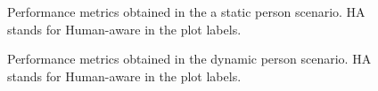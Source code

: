 \begin{figure}[t!]
%

\caption{Performance metrics obtained in the a static person scenario. HA stands for Human-aware in the plot labels.}
\label{fig:boxplots_singlePerson}
\end{figure}

\begin{figure}[!]
\centering
{}%
\hspace{0.1cm}
%

\caption{Performance metrics obtained in the dynamic person scenario. HA stands for Human-aware in the plot labels.}
\label{fig:boxplots_singlePersonMov}
\end{figure}


